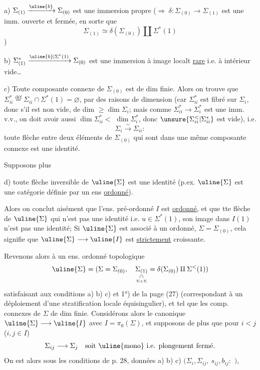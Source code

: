 a) $\Sigma_{(1)}\xrightarrow{\uline{b}}\Sigma_{(0)}$ est une immersion
propre ($\Longrightarrow\ \delta:\Sigma_{(0)}\longrightarrow\Sigma_{(1)}$ est une imm.
ouverte et fermée, en sorte que 
\[
\Sigma_{(1)}\simeq\delta(\Sigma_{(0)})\amalg\Sigma^{*}(1)
\]
)

b) $\Sigma^{*}_{(1)}\xrightarrow{\uline{b}|\Sigma^{*}(1)}\Sigma_{(0)}$ est une immersion à image
localt \uline{rare} i.e. à intérieur vide\ldots

c) \deleted{\unsure{---}} Toute composante connexe de $\Sigma_{(0)}$ est de
dim finie.
Alors on trouve que $\Sigma_{ii}^{*}\overset{\mathrm{déf}}{=}\Sigma_{ii}\cap\Sigma^{*}(1)=\varnothing$,
par des raisons de dimension (car $\Sigma_{ii}^{*}$ est
fibré sur  $\Sigma_i$, donc s'il est non vide, de
dim $\geq\dim\Sigma_i$; mais comme $\Sigma_{ii}^{*}\longrightarrow\Sigma_i^{*}$ est
une imm. v.v., on doit avoir aussi $\dim\Sigma_{ii}^{*}<$
$\dim\Sigma_i^{*}$, donc $\unsure{\Sigma_{ii}^{<}|\Sigma_{ii}^{*}}$ est vide), i.e.
\[
\boxed{\Sigma_i\xrightarrow{\sim}\Sigma_{ii}}:
\]
toute flèche  entre deux
 éléments de $\Sigma_{(0)}$ qui sont dans une
même composante connexe  est une identité.

Supposons  plus

d) toute flèche inversible de $\uline{\Sigma}$ est une identité
(p.ex. $\uline{\Sigma}$ est une catégorie définie par un ens
\uline{ordonné}).

Alors on conclut aisément que l'ens. pré-ordonné $I$ est
\uline{ordonné}, et que tte flèche de $\uline{\Sigma}$ qui n'est pas
une identité i.e. $u\in\Sigma^{*}(1)$, son image dans $I(1)$
n'est pas une identité;
 Si $\uline{\Sigma}$ est associé à un
ordonné, $\Sigma=\Sigma_{(0)}$, cela signifie que
$\uline{\Sigma}\longrightarrow\uline{I}$ est 
\uline{strictement} croissante.

Revenons alors à un  ens. ordonné topologique
\[
\uline{\Sigma}=(\Sigma=\Sigma_{(0)},\quad
\underset{\underset{\Sigma\times\Sigma}{\cap}}{\Sigma_{(1)}}
=\delta(\Sigma_{(0)})\amalg\Sigma^{<}(1))
\]
satisfaisant aux conditions a) b) c) et 1°) de la page (27)
(correspondant  à un déploiement d'une
stratification locale équisingulier), et tel que les comp. connexes
de $\Sigma$  de dim finie.
Considérons alors le 
canonique $\uline{\Sigma}\longrightarrow\uline{I}$ avec $I=\pi_0(\Sigma)$,
et supposons de plus que pour $i<j$ ($i,j\in I$)
\[
\Sigma_{ij}\longrightarrow\Sigma_j\quad\hbox{soit \uline{mono} i.e. plongement fermé.}
\]
On est alors sous les conditions de p. 28,
données a) b) c)
$(\Sigma_i,\Sigma_{ij},\ s_{ij},b_{ij}:$
$)$,

